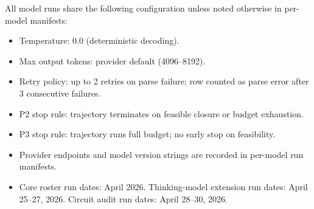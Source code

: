 All model runs share the following configuration unless noted otherwise in per-model manifests:

\begin{itemize}[leftmargin=5mm,itemsep=1mm,topsep=1mm]
    \item Temperature: 0.0 (deterministic decoding).
    \item Max output tokens: provider default (4096--8192).
    \item Retry policy: up to 2 retries on parse failure; row counted as parse error after 3 consecutive failures.
    \item P2 stop rule: trajectory terminates on feasible closure or budget exhaustion.
    \item P3 stop rule: trajectory runs full budget; no early stop on feasibility.
    \item Provider endpoints and model version strings are recorded in per-model run manifests.
    \item Core roster run dates: April 2026. Thinking-model extension run dates: April 25--27, 2026. Circuit audit run dates: April 28--30, 2026.
\end{itemize}
